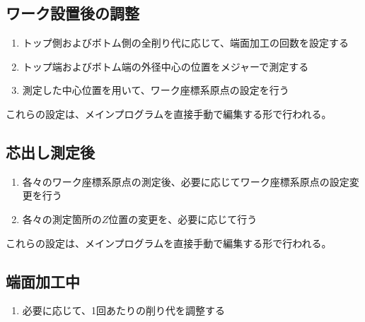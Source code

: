 \subsection{ワーク設置後の調整}
\begin{enumerate}
\item トップ側およびボトム側の全削り代に応じて、端面加工の回数を設定する
\item トップ端およびボトム端の外径中心の位置をメジャーで測定する
\item 測定した中心位置を用いて、ワーク座標系原点の設定を行う
\end{enumerate}
これらの設定は、メインプログラムを直接手動で編集する形で行われる。



\clearpage


\subsection{芯出し測定後}
\begin{enumerate}
\item 各々のワーク座標系原点の測定後、必要に応じてワーク座標系原点の設定変更を行う
\item 各々の測定箇所の$Z$位置の変更を、必要に応じて行う
\end{enumerate}
これらの設定は、メインプログラムを直接手動で編集する形で行われる。


\subsection{端面加工中}
\begin{enumerate}
\item 必要に応じて、1回あたりの削り代を調整する
\end{enumerate}


